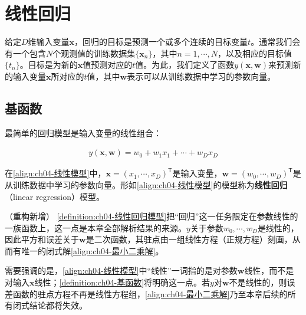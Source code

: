 \documentclass[../../main.tex]{subfiles}
\begin{document}
\section{线性回归}\label{section:ch04-线性回归}

给定$D$维输入变量$\boldsymbol{x}$，回归的目标是预测一个或多个连续的目标变量$t$。通常我们会有一个包含$N$个观测值的训练数据集$\{\boldsymbol{x}_n\}$，其中$n=1,\cdots,N$，以及相应的目标值$\{t_n\}$。目标是为新的$\boldsymbol{x}$值预测对应的$t$值。为此，我们定义了函数$y(\boldsymbol{x},\boldsymbol{w})$来预测新的输入变量$\boldsymbol{x}$所对应的$t$值，其中$\boldsymbol{w}$表示可以从训练数据中学习的参数向量。

\subsection{基函数}\label{subsection:ch04-基函数}

最简单的回归模型是输入变量的线性组合：

\begin{align}
  y(\boldsymbol{x},\boldsymbol{w})=w_0+w_1x_1+\cdots+w_Dx_D
  \label{align:ch04-线性模型}
\end{align}

\begin{definition}[线性回归模型]\label{definition:ch04-线性回归模型}
在\eqref{align:ch04-线性模型}中，$\boldsymbol{x}=(x_1,\cdots,x_D)^{\mathsf{T}}$是输入变量，$\boldsymbol{w}=(w_0,\cdots,w_D)^{\mathsf{T}}$是从训练数据中学习的参数向量。形如\eqref{align:ch04-线性模型}的模型称为\textbf{线性回归}（linear regression）模型。
\end{definition}

\begin{remark}（重构新增）
\cref{definition:ch04-线性回归模型}把“回归”这一任务限定在参数线性的一族函数上，这一点是本章全部解析结果的来源。$y$关于参数$w_0,\cdots,w_D$是线性的，因此平方和误差关于$\boldsymbol{w}$是二次函数，其驻点由一组线性方程（正规方程）刻画，从而有唯一的闭式解\eqref{align:ch04-最小二乘解}。

需要强调的是，\eqref{align:ch04-线性模型}中“线性”一词指的是对参数$\boldsymbol{w}$线性，而不是对输入$\boldsymbol{x}$线性；\cref{definition:ch04-基函数}将明确这一点。若$y$对$\boldsymbol{w}$不是线性的，则误差函数的驻点方程不再是线性方程组，\eqref{align:ch04-最小二乘解}乃至本章后续的所有闭式结论都将失效。
\end{remark}
\end{document}
